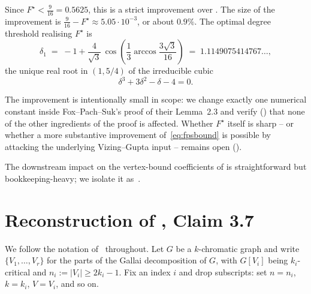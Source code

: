 \documentclass[11pt,a4paper]{article}
\theoremstyle{definition}
\begin{document}
\noindent
Since $F^{\star}<\tfrac{9}{16}=0.5625$, this is a strict improvement over
\cite[Lem.~2.3]{FPS}. The size of the improvement is
$\tfrac{9}{16}-F^{\star}\approx 5.05\cdot10^{-3}$, or about
$0.9\%$. The optimal degree threshold realising $F^\star$ is
\[
  \delta_1
  \;=\; -1+\frac{4}{\sqrt3}\,
        \cos\!\left(\frac13\arccos\frac{3\sqrt3}{16}\right)
  \;=\; 1.1149075414767\ldots,
\]
the unique real root in $(1,5/4)$ of the irreducible cubic
\begin{equation}\label{eq:cubic}
   \delta^3+3\delta^2-\delta-4 = 0.
\end{equation}

The improvement is intentionally small in scope: we change exactly one
numerical constant inside Fox--Pach--Suk's proof of their Lemma~2.3 and
verify () that none of the other ingredients of
the proof is affected. Whether $F^{\star}$ itself is sharp -- or
whether a more substantive improvement of~\eqref{eq:fpsbound} is
possible by attacking the underlying Vizing--Gupta input -- remains
open ().

The downstream impact on the vertex-bound coefficients of
\cite[Thm.~1.2]{FPS} is straightforward but bookkeeping-heavy; we
isolate it as~.

\section{Reconstruction of \texorpdfstring{\cite{FPS}}{[FPS]}, Claim 3.7}
\label{sec:reconstruction}

We follow the notation of~\cite{FPS} throughout. Let $G$ be a
$k$-chromatic graph and write $\{V_1,\dots,V_r\}$ for the parts of the
Gallai decomposition of $G$, with $G[V_i]$ being $k_i$-critical and
$n_i:=|V_i|\ge 2k_i-1$. Fix an index $i$ and drop subscripts: set
$n=n_i$, $k=k_i$, $V=V_i$, and so on.
\end{document}

